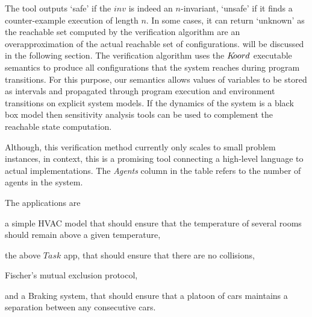 The tool outputs `safe' if the $\mathit{inv}$ is indeed an $n$-invariant, `unsafe' if it finds a counter-example execution of length $n$. In some cases, it can return `unknown' as the reachable set computed by the verification algorithm are an overapproximation of the actual reachable set of configurations.  will be discussed in the following section.  
%
The verification algorithm uses the $K\kern-2pt oord$ executable semantics to produce all configurations that the system reaches during program transitions. For this purpose, our semantics allows values of variables to be stored as intervals and propagated through program execution and environment transitions on explicit system models. If the dynamics of the system is a black box model then sensitivity analysis tools can be used to complement the reachable state computation.  

 Although, this verification method currently only scales to small problem instances, in context, this is a promising tool connecting a high-level language to actual implementations. The \emph{Agents} column in the table refers to the number of agents in the system. 
 
 The applications are 
\begin{inparaenum}[(i)]
\item a simple HVAC model that should ensure that the temperature of several rooms should remain above a  given temperature, 
\item  the above $\mathit{Task}$ app, that should ensure that there are no collisions, 
\item Fischer's mutual exclusion protocol, 
\item and a Braking system, that should ensure that a platoon of cars maintains a separation between any consecutive cars. 
\end{inparaenum}

